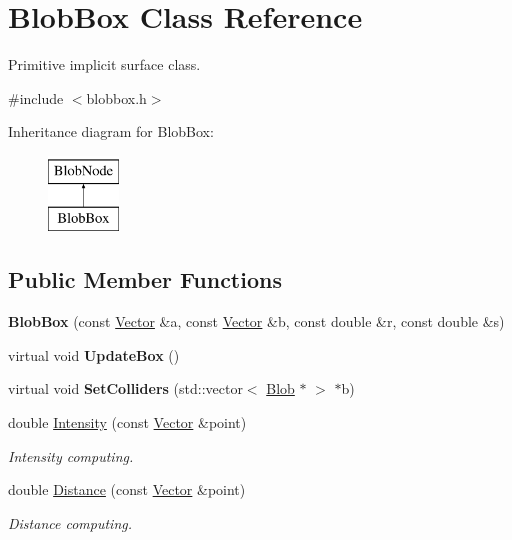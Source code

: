 \hypertarget{class_blob_box}{
\section{BlobBox Class Reference}
\label{class_blob_box}
}


Primitive implicit surface class.  




{\ttfamily \#include $<$blobbox.h$>$}

Inheritance diagram for BlobBox:\begin{figure}[H]
\begin{center}
\leavevmode
\includegraphics[height=2.000000cm]{class_blob_box}
\end{center}
\end{figure}
\subsection*{Public Member Functions}
\begin{DoxyCompactItemize}
\item 
\hypertarget{class_blob_box_a083206a74f50bd6c4f25a9f3642c7233}{
{\bfseries BlobBox} (const \hyperlink{class_vector}{Vector} \&a, const \hyperlink{class_vector}{Vector} \&b, const double \&r, const double \&s)}
\label{class_blob_box_a083206a74f50bd6c4f25a9f3642c7233}

\item 
\hypertarget{class_blob_box_a0ea94bf8692110f8a4ed3f9c4fe4fd86}{
virtual void {\bfseries UpdateBox} ()}
\label{class_blob_box_a0ea94bf8692110f8a4ed3f9c4fe4fd86}

\item 
\hypertarget{class_blob_box_a8db2b9645f8a7d795e1ef4a1502f99a9}{
virtual void {\bfseries SetColliders} (std::vector$<$ \hyperlink{class_blob}{Blob} $\ast$ $>$ $\ast$b)}
\label{class_blob_box_a8db2b9645f8a7d795e1ef4a1502f99a9}

\item 
double \hyperlink{class_blob_box_a77db706ca8bf91da6875b92db33bbcc5}{Intensity} (const \hyperlink{class_vector}{Vector} \&point)
\begin{DoxyCompactList}\small\item\em Intensity computing. \item\end{DoxyCompactList}\item 
double \hyperlink{class_blob_box_a13828cb1f1211b3f3a075cd113564615}{Distance} (const \hyperlink{class_vector}{Vector} \&point)
\begin{DoxyCompactList}\small\item\em Distance computing. \item\end{DoxyCompactList}\end{DoxyCompactItemize}


